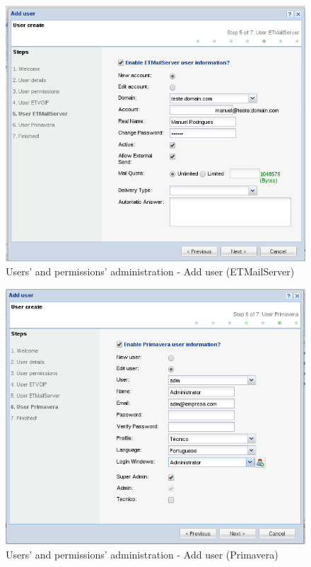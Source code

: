 {\begin{figure}[H]
        \begin{center}
        \includegraphics[scale=0.4]{screenshots/users/etva/create_user_wiz_05.png}
        \caption{Users' and permissions' administration - Add user (ETMailServer)}
        \label{fig:create_user_wiz_05}
        \end{center}
\end{figure}

\begin{figure}[H]
        \begin{center}
        \includegraphics[scale=0.4]{screenshots/users/etva/create_user_wiz_06.png}
        \caption{Users' and permissions' administration - Add user (Primavera)}
        \label{fig:create_user_wiz_06}
        \end{center}
\end{figure}

}

